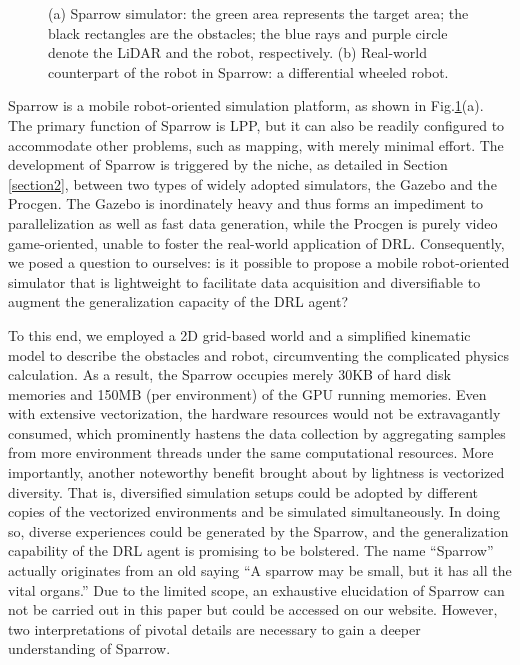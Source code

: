 \documentclass[journal]{IEEEtran}
\begin{document}
\begin{figure}
	\centering
	\hfil
	\caption{(a) Sparrow simulator: the green area represents the target area; the black rectangles are the obstacles; the blue rays and purple circle denote the LiDAR and the robot, respectively. (b) Real-world counterpart of the robot in Sparrow: a differential wheeled robot.}
	\label{S&R}
\end{figure}

Sparrow is a mobile robot-oriented simulation platform, as shown in Fig.\ref{S&R}(a). The primary function of Sparrow is LPP, but it can also be readily configured to accommodate other problems, such as mapping, with merely minimal effort. The development of Sparrow is triggered by the niche, as detailed in Section \ref{section2}, between two types of widely adopted simulators, the Gazebo and the Procgen. The Gazebo is inordinately heavy and thus forms an impediment to parallelization as well as fast data generation, while the Procgen is purely video game-oriented, unable to foster the real-world application of DRL. Consequently, we posed a question to ourselves: is it possible to propose a mobile robot-oriented simulator that is lightweight to facilitate data acquisition and diversifiable to augment the generalization capacity of the DRL agent? 

To this end, we employed a 2D grid-based world and a simplified kinematic model to describe the obstacles and robot, circumventing the complicated physics calculation. As a result, the Sparrow occupies merely 30KB of hard disk memories and 150MB (per environment) of the GPU running memories. Even with extensive vectorization, the hardware resources would not be extravagantly consumed, which prominently hastens the data collection by aggregating samples from more environment threads under the same computational resources. More importantly, another noteworthy benefit brought about by lightness is vectorized diversity. That is, diversified simulation setups could be adopted by different copies of the vectorized environments and be simulated simultaneously. In doing so, diverse experiences could be generated by the Sparrow, and the generalization capability of the DRL agent is promising to be bolstered. The name “Sparrow” actually originates from an old saying “A sparrow may be small, but it has all the vital organs.” Due to the limited scope, an exhaustive elucidation of Sparrow can not be carried out in this paper but could be accessed on our website\footnotemark[1]. However, two interpretations of pivotal details are necessary to gain a deeper understanding of Sparrow.
\end{document}
